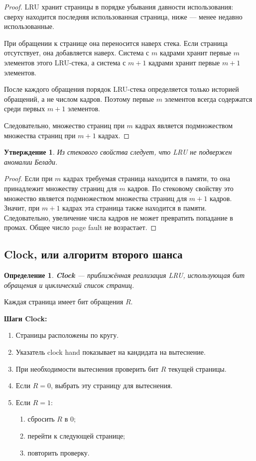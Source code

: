 \documentclass[a4paper,12pt]{article}
\newtheorem{definition}{Определение}
\newtheorem{statement}{Утверждение}
\begin{document}
\begin{proof}
LRU хранит страницы в порядке убывания давности использования: сверху находится последняя использованная страница, ниже --- менее недавно использованные.

При обращении к странице она переносится наверх стека. Если страница отсутствует, она добавляется наверх. Система с $m$ кадрами хранит первые $m$ элементов этого LRU-стека, а система с $m+1$ кадрами хранит первые $m+1$ элементов.

После каждого обращения порядок LRU-стека определяется только историей обращений, а не числом кадров. Поэтому первые $m$ элементов всегда содержатся среди первых $m+1$ элементов.

Следовательно, множество страниц при $m$ кадрах является подмножеством множества страниц при $m+1$ кадрах.
\end{proof}

\begin{statement}
Из стекового свойства следует, что LRU не подвержен аномалии Белади.
\end{statement}

\begin{proof}
Если при $m$ кадрах требуемая страница находится в памяти, то она принадлежит множеству страниц для $m$ кадров.
По стековому свойству это множество является подмножеством множества страниц для $m+1$ кадров.
Значит, при $m+1$ кадрах эта страница также находится в памяти.
Следовательно, увеличение числа кадров не может превратить попадание в промах.
Общее число page fault не возрастает.
\end{proof}

\subsection{Clock, или алгоритм второго шанса}

\begin{definition}
\textbf{Clock} --- приближённая реализация LRU, использующая бит обращения и циклический список страниц.
\end{definition}

Каждая страница имеет бит обращения $R$.

\textbf{Шаги Clock:}

\begin{enumerate}
    \item Страницы расположены по кругу.
    \item Указатель clock hand показывает на кандидата на вытеснение.
    \item При необходимости вытеснения проверить бит $R$ текущей страницы.
    \item Если $R=0$, выбрать эту страницу для вытеснения.
    \item Если $R=1$:
    \begin{enumerate}
        \item сбросить $R$ в 0;
        \item перейти к следующей странице;
        \item повторить проверку.
    \end{enumerate}
\end{enumerate}
\end{document}
